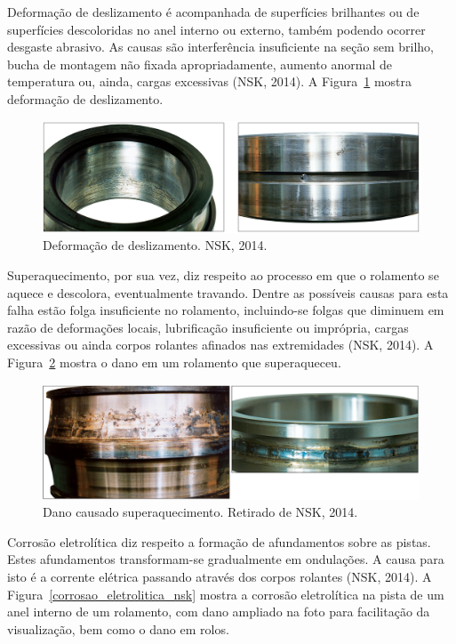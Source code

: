 \documentclass[
	12pt,				
	oneside,			
	a4paper,			
	english,			
	brazil,			
	]{abntex2ppgsi}
\begin{document}
Deformação de deslizamento é acompanhada de superfícies brilhantes ou de superfícies descoloridas no anel interno ou externo, também podendo ocorrer desgaste abrasivo. As causas são interferência insuficiente na seção sem brilho, bucha de montagem não fixada apropriadamente, aumento anormal de temperatura ou, ainda, cargas excessivas (NSK, 2014). A Figura~\ref{deslizamento_nsk} mostra deformação de deslizamento.

\begin{figure}[H]
\centering
\includegraphics[width=\textwidth,height=\textheight,keepaspectratio]{deslizamento_nsk}
\caption {Deformação de deslizamento. NSK, 2014.}
\label{deslizamento_nsk}
\end{figure}

Superaquecimento, por sua vez, diz respeito ao processo em que o rolamento se aquece e descolora, eventualmente travando. Dentre as possíveis causas para esta falha estão folga insuficiente no rolamento, incluindo-se folgas que diminuem em razão de deformações locais, lubrificação insuficiente ou imprópria, cargas excessivas ou ainda corpos rolantes afinados nas extremidades (NSK, 2014). A Figura~\ref{superaquecimento_nsk} mostra o dano em um rolamento que superaqueceu.

\begin{figure}[H]
\centering
\includegraphics[width=\textwidth,height=\textheight,keepaspectratio]{superaquecimento_nsk}
\caption {Dano causado superaquecimento. Retirado de NSK, 2014.}
\label{superaquecimento_nsk}
\end{figure}

Corrosão eletrolítica diz respeito a formação de afundamentos sobre as pistas. Estes afundamentos transformam-se gradualmente em ondulações. A causa para isto é a corrente elétrica passando através dos corpos rolantes (NSK, 2014). A Figura~\ref{corrosao_eletrolitica_nsk} mostra a corrosão eletrolítica na pista de um anel interno de um rolamento, com dano ampliado na foto para facilitação da visualização, bem como o dano em rolos. 
\end{document}
